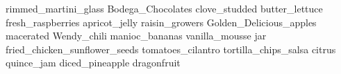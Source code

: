 rimmed\_martini\_glass Bodega\_Chocolates clove\_studded butter\_lettuce fresh\_raspberries apricot\_jelly raisin\_growers Golden\_Delicious\_apples macerated Wendy\_chili manioc\_bananas vanilla\_mousse jar fried\_chicken\_sunflower\_seeds tomatoes\_cilantro tortilla\_chips\_salsa citrus quince\_jam diced\_pineapple dragonfruit 
